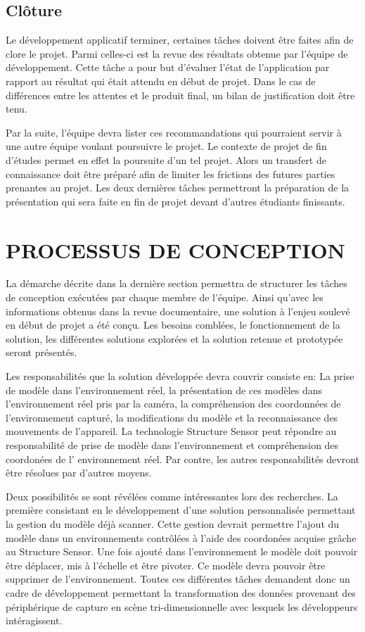 \documentclass[letterpaper,twoside,12pt,french]{report}
\begin{document}
\section*{Clôture}
Le développement applicatif terminer, certaines tâches doivent être faites afin de clore le projet.
Parmi celles-ci est la revue des résultats obtenue par l'équipe de développement. Cette tâche a pour
but d'évaluer l'état de l'application par rapport au résultat qui était attendu en début de projet.
Dans le cas de différences entre les attentes et le produit final, un bilan de justification  doit
être tenu.
\par
Par la suite, l'équipe devra lister ces recommandations qui pourraient servir à une autre équipe voulant
poursuivre le projet. Le contexte de projet de fin d'études permet en effet la poursuite d'un tel
projet. Alors un transfert de connaissance doit être préparé afin de limiter les frictions des
futures parties prenantes au projet. Les deux dernières tâches permettront la préparation de la
présentation qui sera faite en fin de projet devant d'autres étudiants finissants.
\chapter*{\uppercase{Processus de conception}}
La démarche décrite dans la dernière section permettra de structurer les tâches de conception
exécutées par chaque membre de l'équipe. Ainsi qu'avec les informations obtenus dans la revue
documentaire, une solution à l'enjeu soulevé en début de projet a été conçu. Les besoins comblées,
le fonctionnement de la solution, les différentes solutions explorées et la solution retenue et
prototypée seront présentés.
\par
Les responsabilités que la solution développée devra couvrir consiste en: La prise de modèle dans
l'environnement réel, la présentation de ces modèles dans l'environnement réel pris par la caméra,
la compréhension des coordonnées de l'environnement capturé, la modifications du modèle et la
reconnaissance des mouvements de l'appareil. La technologie Structure Sensor peut répondre au
responsabilité de prise de modèle dans l'environnement et compréhension des coordonées de l'
environnement réel. Par contre, les autres responsabilités devront être résolues par d'autres
moyens.
\par
Deux possibilités se sont révélées comme intéressantes lors des recherches. La première consistant
en le développement d'une solution personnalisée permettant la gestion du modèle déjà scanner.
Cette gestion devrait permettre l'ajout du modèle dans un environnements contrôlées à l'aide des
coordonées acquise grâche au Structure Sensor. Une fois ajouté dans l'environnement le modèle doit 
pouvoir être déplacer, mis à l'échelle et être pivoter. Ce modèle devra pouvoir être supprimer de
l'environnement. Toutes ces différentes tâches demandent donc un cadre de développement permettant
la transformation des données provenant des périphérique de capture en scène tri-dimensionnelle
avec lesquels les développeurs intéragissent.
\end{document}
